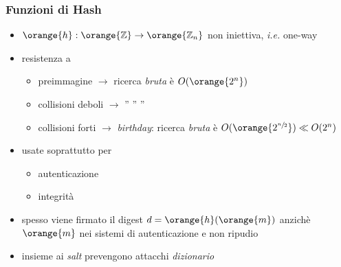 \begin{frame}
	\frametitle{Funzioni di Hash}

	\begin{itemize}
		\item $\orange{h}:\orange{\mathbb{Z}}\rightarrow \orange{\mathbb{Z}_n}$ non iniettiva, \textit{i.e.} one-way

		\item resistenza a
		\begin{itemize}
			\item preimmagine $\rightarrow$ ricerca \textit{bruta} è $O(\orange{2^n})$
			\item collisioni deboli $\rightarrow$ \;\;\;\;\; ''\;\;\;\;\; ''\;\;\;\;\; ''
			\item collisioni forti $\rightarrow$ \textit{birthday}: ricerca \textit{bruta} è $O(\orange{2^{\sfrac{n}{2}}}) \ll O(2^n)$
		\end{itemize}
		
		\item usate soprattutto per
		\begin{itemize}
		  \item autenticazione
		  \item integrità
		\end{itemize}
		\item spesso viene firmato il {\color{blue}digest} $d=\orange{h}(\orange{m})$ anzichè $\orange{m}$
		\newline nei sistemi di autenticazione e non ripudio
		\item insieme ai \textit{salt} prevengono attacchi \textit{dizionario}
	\end{itemize}

\end{frame}
